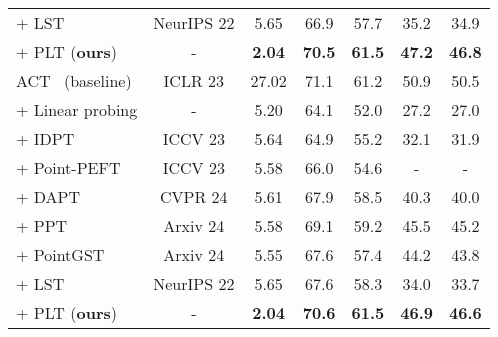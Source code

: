 \begin{table}
\begin{tabular}{lcccccc}
    + LST~\cite{sung2022lst} & NeurIPS 22 & 5.65 & 66.9 & 57.7 & 35.2 & 34.9 \\
    \rowcolor{linecolor!40}+ PLT (\textbf{ours})& - & \textbf{2.04}  & \textbf{70.5} & \textbf{61.5} & \textbf{47.2} & \textbf{46.8} \\
    \midrule
    ACT~\cite{dong2022autoencoders} (baseline) &  ICLR 23 & 27.02 & 71.1 & 61.2 & 50.9 & 50.5 \\ 
    + Linear probing & - & 5.20  & 64.1  & 52.0 & 27.2 & 27.0 \\
    + IDPT~\cite{zha2023instance} & ICCV 23 & 5.64  & 64.9  & 55.2 & 32.1 & 31.9 \\
    + Point-PEFT~\cite{tang2024point} & ICCV 23 & 5.58  & 66.0  & 54.6 & - & - \\
    + DAPT~\cite{zhou2024dynamic} & CVPR 24 & 5.61  & 67.9 & 58.5 & 40.3 & 40.0 \\
    + PPT~\cite{zhang2024positional} & Arxiv 24 & 5.58 & 69.1 & 59.2 & 45.5 & 45.2\\
    + PointGST~\cite{liang2024parameter} & Arxiv 24 & 5.55  & 67.6 & 57.4 & 44.2 & 43.8 \\
    + LST~\cite{sung2022lst} & NeurIPS 22 & 5.65 & 67.6 & 58.3 & 34.0 & 33.7 \\
    \rowcolor{linecolor!40}+ PLT (\textbf{ours})& - & \textbf{2.04}  & \textbf{70.6} & \textbf{61.5} & \textbf{46.9} & \textbf{46.6} \\
    \bottomrule
    \end{tabular}
  \label{tab:semantic_segmentation}
\end{table}
